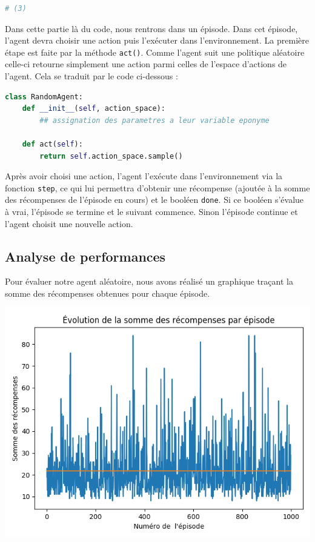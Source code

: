 \documentclass[10pt,a4paper]{article}
\begin{document}
\begin{lstlisting}[language=Python]
# (3)
\end{lstlisting}
Dans cette partie là du code, nous rentrons dans un épisode. Dans cet épisode, l'agent devra choisir une action puis l'exécuter dans l'environnement. La première étape est faite par la méthode \lstinline{act()}. Comme l'agent suit une politique aléatoire celle-ci retourne simplement une action parmi celles de l'espace d'actions de l'agent. Cela se traduit par le code ci-dessous :

\begin{lstlisting}[language=Python, caption=Implémentation de l'agent aléatoire]
class RandomAgent:
    def __init__(self, action_space):
        ## assignation des parametres a leur variable eponyme

    def act(self):
        return self.action_space.sample()
\end{lstlisting}
Après avoir choisi une action, l'agent l'exécute dans l'environnement via la fonction \lstinline{step}, ce qui lui permettra d'obtenir une récompense (ajoutée à la somme des récompenses de l'épisode en cours) et le booléen \lstinline{done}. Si ce booléen s'évalue à vrai, l'épisode se termine et le suivant commence. Sinon l'épisode continue et l'agent choisit une nouvelle action.

\subsection{Analyse de performances}


Pour évaluer notre agent aléatoire, nous avons réalisé un graphique traçant la somme des récompenses obtenues pour chaque épisode.

\includegraphics[scale=0.5]{../performances/evolution_recompenses_random.png} 
\end{document}
